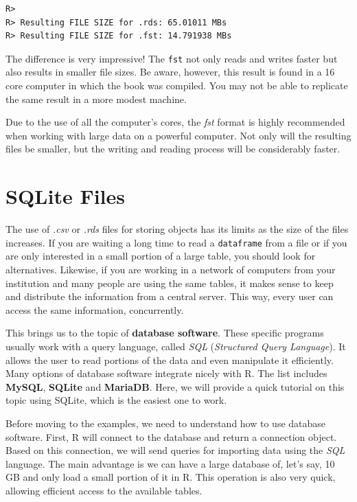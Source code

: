 \documentclass[
  12pt,
]{book}
\newenvironment{rmdimportant}
{\begin{importantblock}
		
	} {\end{importantblock}}
\begin{document}
\begin{verbatim}
R> 
R> Resulting FILE SIZE for .rds: 65.01011 MBs
R> Resulting FILE SIZE for .fst: 14.791938 MBs
\end{verbatim}

The difference is very impressive! The \texttt{fst} not only reads and writes faster but also results in smaller file sizes. Be aware, however, this result is found in a 16 core computer in which the book was compiled. You may not be able to replicate the same result in a more modest machine.

\begin{rmdimportant}
Due to the use of all the computer's cores, the \emph{fst} format is
highly recommended when working with large data on a powerful computer.
Not only will the resulting files be smaller, but the writing and
reading process will be considerably faster.
\end{rmdimportant}

\hypertarget{sqlite-files}{%
\section{SQLite Files}\label{sqlite-files}}

The use of \emph{.csv} or \emph{.rds} files for storing objects has its limits as the size of the files increases. If you are waiting a long time to read a \texttt{dataframe} from a file or if you are only interested in a small portion of a large table, you should look for alternatives. Likewise, if you are working in a network of computers from your institution and many people are using the same tables, it makes sense to keep and distribute the information from a central server. This way, every user can access the same information, concurrently.

This brings us to the topic of \textbf{database software}. These specific programs usually work with a query language, called \emph{SQL} (\emph{Structured Query Language}). It allows the user to read portions of the data and even manipulate it efficiently. Many options of database software integrate nicely with R. The list includes \textbf{MySQL}, \textbf{SQLite} and \textbf{MariaDB}. Here, we will provide a quick tutorial on this topic using SQLite, which is the easiest one to work.   

Before moving to the examples, we need to understand how to use database software. First, R will connect to the database and return a connection object. Based on this connection, we will send queries for importing data using the \emph{SQL} language. The main advantage is we can have a large database of, let's say, 10 GB and only load a small portion of it in R. This operation is also very quick, allowing efficient access to the available tables.
\end{document}

